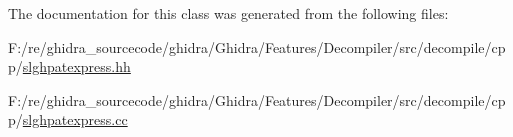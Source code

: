 The documentation for this class was generated from the following files\+:\begin{DoxyCompactItemize}
\item 
F\+:/re/ghidra\+\_\+sourcecode/ghidra/\+Ghidra/\+Features/\+Decompiler/src/decompile/cpp/\mbox{\hyperlink{slghpatexpress_8hh}{slghpatexpress.\+hh}}\item 
F\+:/re/ghidra\+\_\+sourcecode/ghidra/\+Ghidra/\+Features/\+Decompiler/src/decompile/cpp/\mbox{\hyperlink{slghpatexpress_8cc}{slghpatexpress.\+cc}}\end{DoxyCompactItemize}

